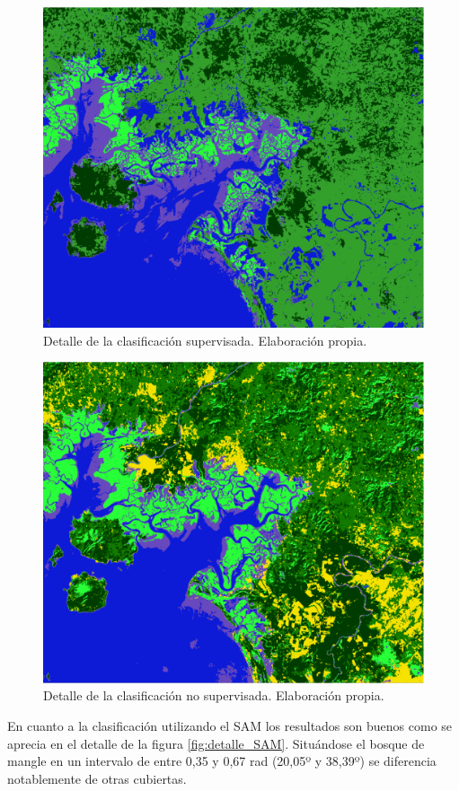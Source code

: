 \begin{figure}
	\centering
	\includegraphics[width=0.8\linewidth]{./Imagenes/Detalle_classup.eps}
	\caption[Detalle clasificación supervisada]{Detalle de la clasificación supervisada. Elaboración propia.}
	\label{fig:detalle_classup}
\end{figure}

\begin{figure}
	\centering
	\includegraphics[width=0.8\linewidth]{./Imagenes/Detalle_clasnosup.eps}
	\caption[Detalle clasificación no supervisada]{Detalle de la clasificación no supervisada. Elaboración propia.}
	\label{fig:detalle_clasnosup}
\end{figure}

En cuanto a la clasificación utilizando el \ac{SAM} los resultados son buenos como se aprecia en el detalle de la figura \ref{fig:detalle_SAM}. Situándose el bosque de mangle en un intervalo de entre 0,35 y 0,67 rad (20,05º y 38,39º) se diferencia notablemente de otras cubiertas.

